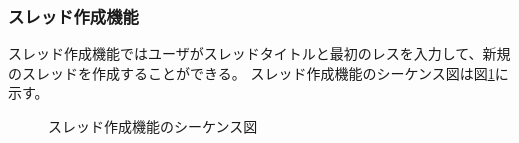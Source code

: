 \documentclass[a4j]{jarticle}
\begin{document}
\subsubsection{スレッド作成機能}
スレッド作成機能ではユーザがスレッドタイトルと最初のレスを入力して、新規のスレッドを作成することができる。
スレッド作成機能のシーケンス図は図\ref{fig:bbs_thread.png}に示す。
        \begin{figure}[H]
\centering
{}
\caption{スレッド作成機能のシーケンス図}
\label{fig:bbs_thread.png}
\end{figure}
\end{document}
